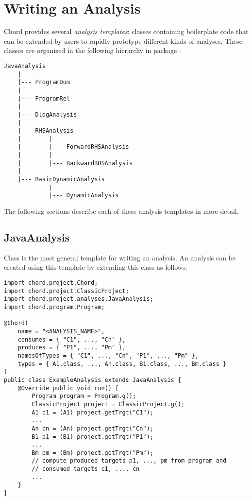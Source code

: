 \chapter{Writing an Analysis}
\label{chap:writing-analysis}

Chord provides several {\it analysis templates}: classes containing boilerplate
code that can be extended by users to rapidly prototype different kinds of
analyses.  These classes are organized in the following hierarchy in package
:

\begin{verbatim}
JavaAnalysis
    |
    |--- ProgramDom
    |
    |--- ProgramRel
    |
    |--- DlogAnalysis
    |
    |--- RHSAnalysis
    |        |
    |        |--- ForwardRHSAnalysis
    |        |
    |        |--- BackwardRHSAnalysis
    |
    |--- BasicDynamicAnalysis
             |
             |--- DynamicAnalysis
\end{verbatim}

The following sections describe each of these analysis templates in more detail.

\section{JavaAnalysis}
\label{sec:java-analysis}

Class 
is the most general template for writing an analysis.  An analysis can be
created using this template by extending this class as follows:

\begin{framed}
\begin{verbatim}
import chord.project.Chord;
import chord.project.ClassicProject;
import chord.project.analyses.JavaAnalysis;
import chord.program.Program;

@Chord(
    name = "<ANALYSIS_NAME>",
    consumes = { "C1", ..., "Cn" },
    produces = { "P1", ..., "Pm" },
    namesOfTypes = { "C1", ..., "Cn", "P1", ..., "Pm" },
    types = { A1.class, ..., An.class, B1.class, ..., Bm.class }
)
public class ExampleAnalysis extends JavaAnalysis {
    @Override public void run() {
        Program program = Program.g();
        ClassicProject project = ClassicProject.g();
        A1 c1 = (A1) project.getTrgt("C1");
        ...
        An cn = (An) project.getTrgt("Cn");
        B1 p1 = (B1) project.getTrgt("P1");
        ...
        Bm pm = (Bm) project.getTrgt("Pm");
        // compute produced targets p1, ..., pm from program and
        // consumed targets c1, ..., cn
        ...
    }
}
\end{verbatim}
\end{framed}

